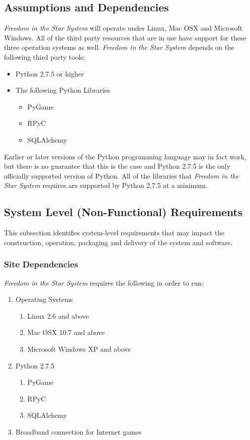 \documentclass[twoside,letterpaper]{article}
\begin{document}
\subsection{Assumptions and Dependencies}
\textit{Freedom in the Star System} will operate under Linux, Mac OSX and Microsoft Windows.  All of the third party resources that are in use have support for these three operation systems as well.  \textit{Freedom in the Star System} depends on the following third party tools:
	\begin{itemize}
		\item Python 2.7.5 or higher
		\item The following Python Libraries
		\begin{itemize}
			\item PyGame
			\item RPyC
			\item SQLAlchemy
		\end{itemize}
	\end{itemize}

Earlier or later versions of the Python programming language may in fact work, but there is no guarantee that this is the case and Python 2.7.5 is the only officially supported version of Python.  All of the libraries that \textit{Freedom in the Star System} requires are supported by Python 2.7.5 at a minimum.

\subsection{System Level (Non-Functional) Requirements}
This subsection identifies system-level requirements that may impact the construction, operation, packaging and delivery of the system and software.

\subsubsection{Site Dependencies}
\textit{Freedom in the Star System} requires the following in order to run:
\begin{enumerate}
	\item Operating Systems
	\begin{enumerate}
		\item Linux 2.6 and above
		\item Mac OSX 10.7 and above
		\item Microsoft Windows XP and above
	\end{enumerate}
	\item Python 2.7.5
	\begin{enumerate}
		\item PyGame
		\item RPyC
		\item SQLAlchemy
	\end{enumerate}
	\item Broadband connection for Internet games
\end{enumerate}
\end{document}
